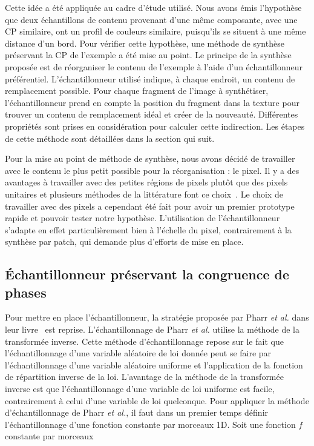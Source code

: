 \bigskip

Cette idée a été appliquée au cadre d'étude utilisé. Nous avons émis l'hypothèse que deux échantillons de contenu provenant d'une même composante, avec une CP similaire, ont un profil de couleurs similaire, puisqu'ils se situent à une même distance d'un bord. Pour vérifier cette hypothèse, une méthode de synthèse préservant la CP de l'exemple a été mise au point. Le principe de la synthèse proposée est de réorganiser le contenu de l'exemple à l'aide d'un échantillonneur préférentiel. L'échantillonneur utilisé indique, à chaque endroit, un contenu de remplacement possible. Pour chaque fragment de l'image à synthétiser, l'échantillonneur prend en compte la position du fragment dans la texture pour trouver un contenu de remplacement idéal et créer de la nouveauté. Différentes propriétés sont prises en considération pour calculer cette indirection. Les étapes de cette méthode sont détaillées dans la section qui suit.

\bigskip

Pour la mise au point de méthode de synthèse, nous avons décidé de travailler avec le contenu le plus petit possible pour la réorganisation : le pixel. Il y a des avantages à travailler avec des petites régions de pixels plutôt que des pixels unitaires et plusieurs méthodes de la littérature font ce choix~\cite{wei_state_2009}. Le choix de travailler avec des pixels a cependant été fait pour avoir un premier prototype rapide et pouvoir tester notre hypothèse. L'utilisation de l'échantillonneur s'adapte en effet particulièrement bien à l'échelle du pixel, contrairement à la synthèse par patch, qui demande plus d'efforts de mise en place.

\subsection{Échantillonneur préservant la congruence de phases}

Pour mettre en place l'échantillonneur, la stratégie proposée par Pharr \textit{et al.} dans leur livre~\cite{pharr_physically_2023} est reprise. L'échantillonnage de Pharr \textit{et al.} utilise la méthode de la transformée inverse. Cette méthode d'échantillonnage repose sur le fait que l'échantillonnage d'une variable aléatoire de loi donnée peut se faire par l'échantillonnage d'une variable aléatoire uniforme et l'application de la fonction de répartition inverse de la loi. L'avantage de la méthode de la transformée inverse est que l'échantillonnage d'une variable de loi uniforme est facile, contrairement à celui d'une variable de loi quelconque. Pour appliquer la méthode d'échantillonnage de Pharr \textit{et al.}, il faut dans un premier temps définir l'échantillonnage d'une fonction constante par morceaux 1D. Soit une fonction $f$ constante par morceaux


